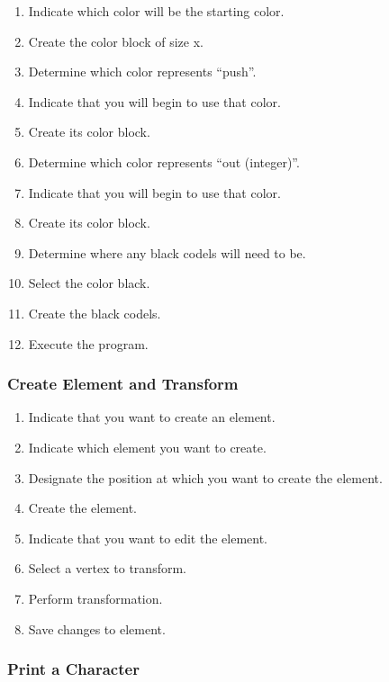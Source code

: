 \begin{enumerate}
  \item Indicate which color will be the starting color.
  \item Create the color block of size x.
  \item Determine which color represents ``push''.
  \item Indicate that you will begin to use that color.
  \item Create its color block.
  \item Determine which color represents ``out (integer)''.
  \item Indicate that you will begin to use that color.
  \item Create its color block.
  \item Determine where any black codels will need to be.
  \item Select the color black.
  \item Create the black codels.
  \item Execute the program.
\end{enumerate}

\subsubsection{Create Element and Transform}
\label{app:euc_create_transform}

\begin{enumerate}
  \item Indicate that you want to create an element.
  \item Indicate which element you want to create.
  \item Designate the position at which you want to create the element.
  \item Create the element.
  \item Indicate that you want to edit the element.
  \item Select a vertex to transform.
  \item Perform transformation.
  \item Save changes to element.
\end{enumerate}

\subsubsection{Print a Character}
\label{app:euc_print_character}

